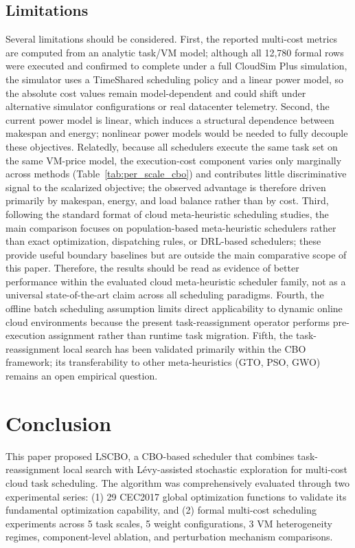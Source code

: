 \documentclass[pdflatex,onecolumn,sn-mathphys-num]{sn-jnl}
\begin{document}
\subsection{Limitations}
Several limitations should be considered. First, the reported multi-cost metrics are computed from an analytic task/VM model; although all 12,780 formal rows were executed and confirmed to complete under a full CloudSim Plus simulation, the simulator uses a TimeShared scheduling policy and a linear power model, so the absolute cost values remain model-dependent and could shift under alternative simulator configurations or real datacenter telemetry. Second, the current power model is linear, which induces a structural dependence between makespan and energy; nonlinear power models would be needed to fully decouple these objectives. Relatedly, because all schedulers execute the same task set on the same VM-price model, the execution-cost component varies only marginally across methods (Table~\ref{tab:per_scale_cbo}) and contributes little discriminative signal to the scalarized objective; the observed advantage is therefore driven primarily by makespan, energy, and load balance rather than by cost. Third, following the standard format of cloud meta-heuristic scheduling studies, the main comparison focuses on population-based meta-heuristic schedulers rather than exact optimization, dispatching rules, or DRL-based schedulers; these provide useful boundary baselines but are outside the main comparative scope of this paper. Therefore, the results should be read as evidence of better performance within the evaluated cloud meta-heuristic scheduler family, not as a universal state-of-the-art claim across all scheduling paradigms. Fourth, the offline batch scheduling assumption limits direct applicability to dynamic online cloud environments because the present task-reassignment operator performs pre-execution assignment rather than runtime task migration. Fifth, the task-reassignment local search has been validated primarily within the CBO framework; its transferability to other meta-heuristics (GTO, PSO, GWO) remains an open empirical question.

\section{Conclusion}\label{sec7}

This paper proposed LSCBO, a CBO-based scheduler that combines task-reassignment local search with L\'{e}vy-assisted stochastic exploration for multi-cost cloud task scheduling. The algorithm was comprehensively evaluated through two experimental series: (1) 29 CEC2017 global optimization functions to validate its fundamental optimization capability, and (2) formal multi-cost scheduling experiments across 5 task scales, 5 weight configurations, 3 VM heterogeneity regimes, component-level ablation, and perturbation mechanism comparisons.
\end{document}
